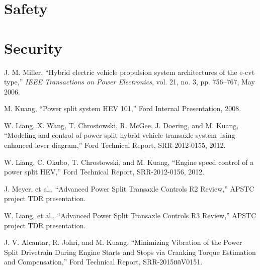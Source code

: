 \documentclass[11pt,letterpaper]{report}
\begin{document}
\section{Safety}
\section{Security}

\begin{thebibliography}{199}



 J. M. Miller, ``Hybrid electric vehicle propulsion system
  architectures of the e-cvt type,'' {\it IEEE Transactions on Power
    Electronics}, vol. 21, no. 3, pp. 756--767, May 2006.

 M. Kuang, ``Power split system HEV 101,'' Ford
  Internal Presentation, 2008.


 W. Liang, X. Wang, T.
  Chrostowski, R. McGee, J. Doering, and M. Kuang, ``Modeling and control of power
  split hybrid vehicle transaxle system using enhanced lever diagram,''
  Ford Technical Report, SRR-2012-0155, 2012.

 W. Liang, C. Okubo, T. Chrostowski, and
  M. Kuang, ``Engine speed control of a power split HEV,'' Ford
  Technical Report, SRR-2012-0156, 2012.

 J. Meyer, et al., ``Advanced Power
  Split Transaxle Controls R2 Review,'' APSTC project TDR presentation. 


 W. Liang, et al., ``Advanced Power
  Split Transaxle Controls R3 Review,'' APSTC project TDR presentation. 

 J. V. Alcantar, R. Johri, and M. Kuang,
  ``Minimizing Vibration of the Power Split Drivetrain During Engine
  Starts and Stops via Cranking Torque Estimation and Compensation,''
  Ford Technical Report, SRR-2015ยกV0151.


\end{thebibliography}
\end{document}
